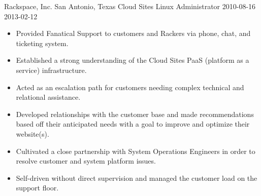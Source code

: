 \roleheader
    {Rackspace, Inc.}
    {San Antonio, Texas}
    {Cloud Sites Linux Administrator }
    {2010-08-16}
    {2013-02-12}

\begin{itemize}
    \item Provided Fanatical Support to customers and Rackers via phone, chat, and ticketing system.
    \item Established a strong understanding of the Cloud Sites PaaS (platform as a service) infrastructure.
    \item Acted as an escalation path for customers needing complex technical and relational assistance.
    \item Developed relationships with the customer base and made recommendations based off their anticipated needs with a goal to improve and optimize their website(s).
    \item Cultivated a close partnership with System Operations Engineers in order to resolve customer and system platform issues.
    \item Self-driven without direct supervision and managed the customer load on the support floor.
\end{itemize}